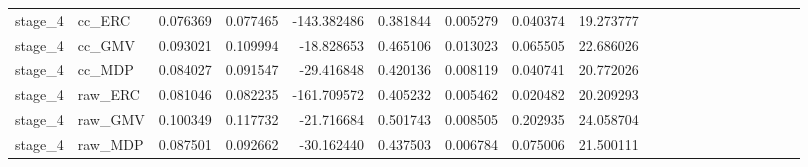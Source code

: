 \begin{tabular}{llrrrrrrrrrrrrrrrrrr}
stage_4 & cc_ERC & 0.076369 & 0.077465 & -143.382486 & 0.381844 & 0.005279 & 0.040374 & 19.273777 \\
stage_4 & cc_GMV & 0.093021 & 0.109994 & -18.828653 & 0.465106 & 0.013023 & 0.065505 & 22.686026 \\
stage_4 & cc_MDP & 0.084027 & 0.091547 & -29.416848 & 0.420136 & 0.008119 & 0.040741 & 20.772026 \\
stage_4 & raw_ERC & 0.081046 & 0.082235 & -161.709572 & 0.405232 & 0.005462 & 0.020482 & 20.209293 \\
stage_4 & raw_GMV & 0.100349 & 0.117732 & -21.716684 & 0.501743 & 0.008505 & 0.202935 & 24.058704 \\
stage_4 & raw_MDP & 0.087501 & 0.092662 & -30.162440 & 0.437503 & 0.006784 & 0.075006 & 21.500111 \\
\bottomrule
\end{tabular}
